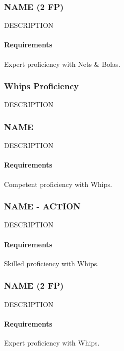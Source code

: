 \subsubsection{NAME (2 FP)} \label{feat::name}
    DESCRIPTION
    \paragraph{Requirements} Expert proficiency with Nets \& Bolas.
\subsubsection{Whips Proficiency} \label{feat::name}
    DESCRIPTION
\subsubsection{NAME} \label{feat::name}
    DESCRIPTION
    \paragraph{Requirements} Competent proficiency with Whips.
\subsubsection{NAME - ACTION} \label{feat::name}
    DESCRIPTION
    \paragraph{Requirements} Skilled proficiency with Whips.
\subsubsection{NAME (2 FP)} \label{feat::name}
    DESCRIPTION
    \paragraph{Requirements} Expert proficiency with Whips.


